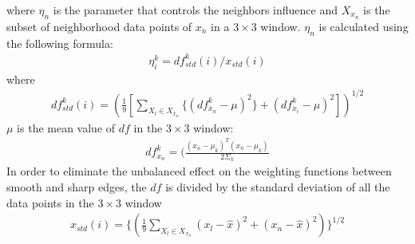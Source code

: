 \documentclass[12pt,letterpaper]{article}
\begin{document}
where $\eta_n$ is the parameter that controls the neighbors influence and $X_{x_n}$ is the subset of 
neighborhood data points of $x_n$ in a $3\times3$ window. $\eta_n$ is calculated using the following formula:
\begin{align}
\eta_i^k = df_{std}^{k}(i)/x_{std}(i)
\end{align}
where
\begin{align}
df_{std}^{k}(i) = (\frac{1}{9} [ \sum_{X_l \in X_{x_n}} \lbrace ( df_{x_n}^k - \mu)^2\rbrace + (df_{x_i}^k - \mu)^2])^{1/2}
\end{align}
$\mu$ is the mean value of $df$ in the $3\times3$ window:
\begin{align}
df_{x_n}^{k} = (\frac{(x_n - \mu_k)^T(x_n - \mu_k)}{2\Sigma_k} 
\end{align}
In order to eliminate the unbalanced effect on the weighting functions between smooth and sharp edges,
the $df$ is divided by the standard deviation of all the data points in the $3\times3$ window
\begin{align}
x_{std}(i) = \lbrace (\frac{1}{9} \sum_{X_l \in X_{x_n}} (x_l - \hat{x})^2 + (x_n - \hat{x})^2)\rbrace ^{1/2}
\end{align}
\end{document}
